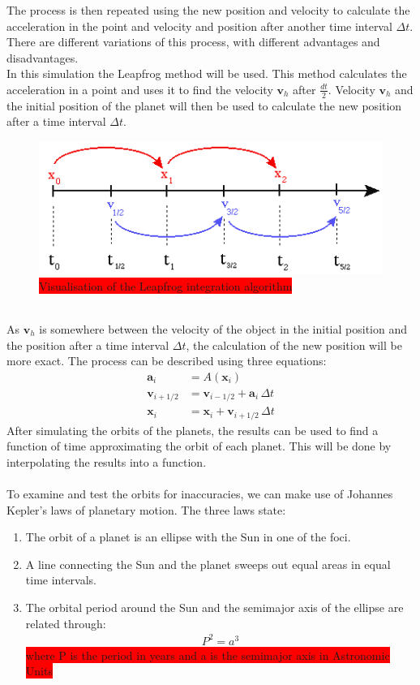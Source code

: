 \documentclass[reprint,english,notitlepage]{revtex4-2}
\begin{document}
The process is then repeated using the new position and velocity to calculate the acceleration in the point and velocity and position after another time interval $\Delta t$.
There are different variations of this process, with different advantages and disadvantages.\\
In this simulation the Leapfrog method will be used.
This method calculates the acceleration in a point and uses it to find the velocity $\textbf{v}_h$ after $ \frac{dt}{2}$.
Velocity $\textbf{v}_h$ and the initial position of the planet will then be used to calculate the new position after a time interval $\Delta t$.\\
\begin{figure}[h]
	\centering
	\includegraphics[scale=0.4]{Figures/leapfrog1}
	\caption{\colorbox{red}{Visualisation of the Leapfrog integration algorithm}}\label{fig:Leapfrog_vis}
\end{figure}\\
As $\textbf{v}_h$ is somewhere between the velocity of the object in the initial position and the position after a time interval $\Delta t$, the calculation of the new position will be more exact.
The process can be described using three equations:
\begin{align*}
    \textbf{a}_i &= A(\textbf{x}_i)\\
	\textbf{v}_{i+1/2} &= \textbf{v}_{i-1/2} + \textbf{a}_i\,\Delta t\\
	\textbf{x}_{i} &= \textbf{x}_i + \textbf{v}_{i+1/2}\,\Delta t
\end{align*}
After simulating the orbits of the planets, the results can be used to find a function of time approximating the orbit of each planet.
This will be done by interpolating the results into a function.\\\\

To examine and test the orbits for inaccuracies, we can make use of Johannes Kepler's laws of planetary motion.
The three laws state:
\begin{enumerate}
    \item The orbit of a planet is an ellipse with the
		Sun in one of the foci.
	\item A line connecting the Sun and the planet
		sweeps out equal areas in equal time intervals.
	\item The orbital period around the Sun and the
		semimajor axis of the ellipse are related through:
		\begin{align*}
		    P^2 = a^3
		\end{align*}
		\colorbox{red}{where P is the period in years and a is the
		semimajor axis in Astronomic Units}
\end{enumerate}
\end{document}
